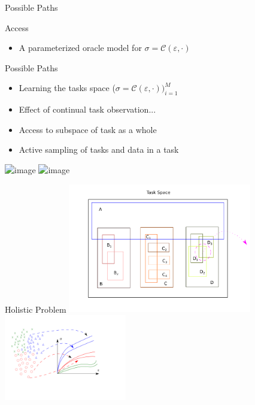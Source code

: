 \begin{frame}{Possible Paths}
  \begin{minipage}{0.6\textwidth}
    \begin{block}{\color{white}Access}
  \begin{itemize}
    \item<1> A parameterized oracle model for $\sigma=\mathcal{C}(\varepsilon, \cdot)$
  \end{itemize}
  \end{block}
  \begin{block}{\color{white}Possible Paths}
  \begin{itemize}
    \item<2> Learning the tasks space ($\sigma=\mathcal{C}(\varepsilon, \cdot))_{i=1}^M$
    \item<3> Effect of continual task observation...
    \item<4> Access to subspace of task as a whole 
    \item<5> Active sampling of tasks and data in a task
  \end{itemize}
  \end{block}
  \end{minipage}%
  \begin{minipage}{0.4\textwidth}
    \includegraphics<2-4>[width=\textwidth]{Figures/myview/tasks}
    \includegraphics<5>[width=\textwidth]{Figures/myview/task_space}
  \end{minipage}
\end{frame}

\begin{frame}{Holistic Problem}
\centering
\includegraphics[width=0.6\textwidth]{Figures/myview/tasks.pdf}\includegraphics[width=0.4\textwidth]{Figures/myview/task_space.pdf}
\end{frame}

